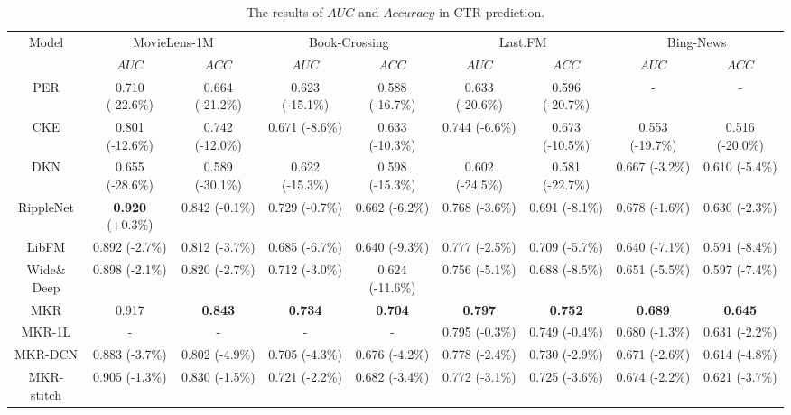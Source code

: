 \documentclass[sigconf]{acmart}
\begin{document}
        \begin{table*}[t]
\setlength{\tabcolsep}{4pt}
            \centering
            \caption{The results of $AUC$ and $Accuracy$ in CTR prediction.}
            \begin{tabular}{c|cccccccc}
            	\hline
            	\multirow{2}{*}{Model} & \multicolumn{2}{c}{MovieLens-1M} & \multicolumn{2}{c}{Book-Crossing} & \multicolumn{2}{c}{Last.FM} & \multicolumn{2}{c}{Bing-News} \\
            	\cline{2-9}
            	& $AUC$ & $ACC$ & $AUC$ & $ACC$ & $AUC$ & $ACC$ & $AUC$ & $ACC$ \\
            	\hline
            	PER & 0.710 (-22.6\%) & 0.664 (-21.2\%) & 0.623 (-15.1\%) & 0.588 (-16.7\%) & 0.633 (-20.6\%) & 0.596 (-20.7\%) & - & - \\
            	CKE & 0.801 (-12.6\%) & 0.742 (-12.0\%) & 0.671 (-8.6\%) & 0.633 (-10.3\%) & 0.744 (-6.6\%) & 0.673  (-10.5\%) & 0.553 (-19.7\%) & 0.516 (-20.0\%) \\
            	DKN & 0.655 (-28.6\%)  & 0.589 (-30.1\%) & 0.622 (-15.3\%) & 0.598 (-15.3\%) & 0.602 (-24.5\%) & 0.581 (-22.7\%) & 0.667 (-3.2\%) & 0.610 (-5.4\%) \\
				RippleNet & \textbf{0.920} (+0.3\%) & 0.842 (-0.1\%) & 0.729 (-0.7\%) & 0.662 (-6.2\%) & 0.768 (-3.6\%) & 0.691 (-8.1\%) & 0.678 (-1.6\%) & 0.630 (-2.3\%)\\            	
            	LibFM & 0.892 (-2.7\%) & 0.812 (-3.7\%) & 0.685 (-6.7\%) & 0.640 (-9.3\%) & 0.777 (-2.5\%) & 0.709 (-5.7\%) & 0.640 (-7.1\%) & 0.591 (-8.4\%) \\
            	Wide$\&$Deep & 0.898 (-2.1\%) & 0.820 (-2.7\%) & 0.712 (-3.0\%) & 0.624 (-11.6\%) & 0.756 (-5.1\%) & 0.688 (-8.5\%) & 0.651 (-5.5\%) & 0.597 (-7.4\%) \\
            	\hline
            	MKR & 0.917 & \textbf{0.843} & \textbf{0.734} & \textbf{0.704} & \textbf{0.797} & \textbf{0.752} & \textbf{0.689} & \textbf{0.645} \\
            	MKR-1L & - & - & - & - & 0.795 (-0.3\%) & 0.749 (-0.4\%) & 0.680 (-1.3\%) & 0.631 (-2.2\%) \\
            	MKR-DCN & 0.883 (-3.7\%) & 0.802 (-4.9\%) & 0.705 (-4.3\%) & 0.676 (-4.2\%) & 0.778 (-2.4\%) & 0.730 (-2.9\%) & 0.671 (-2.6\%) & 0.614 (-4.8\%) \\
            	MKR-stitch & 0.905 (-1.3\%) & 0.830 (-1.5\%) & 0.721 (-2.2\%) & 0.682 (-3.4\%) & 0.772 (-3.1\%) & 0.725  (-3.6\%) & 0.674 (-2.2\%) & 0.621 (-3.7\%) \\
            	\hline
			\end{tabular}
			\label{table:ctr}
		\end{table*}
		
\end{document}
